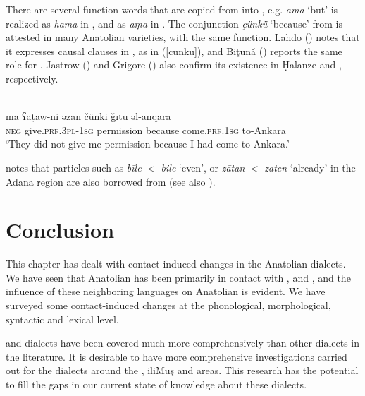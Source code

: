 \documentclass[output=paper]{langsci/langscibook}
\begin{document}
There are several function words that are copied from  into , e.g.  \textit{ama} `but' is realized as \textit{hama} in , and as \textit{a\d{m}a} in  . The conjunction \textit{\c{c}\"{u}nk\"{u}} `because' from  is attested in many Anatolian varieties, with the same function. Lahdo (\citeyear[179]{Lahdo2009}) notes that it expresses causal clauses in , as in (\ref{cunku}), and Biţună  (\citeyear[213]{Bituna2016}) reports the same role for . Jastrow (\citeyear[278]{Jastrow1981}) and Grigore (\citeyear[261]{Grigore2007book}) also confirm its existence in Ḥalanze and , respectively.

\begin{exe}
\ex {}  \citep[179]{Lahdo2009}\\
\label{cunku} \gll m\={a} ʕa\d{t}aw-ni əzan \v{c}\"{u}nki \v{g}\={i}tu əl-anqara\\
\textsc{neg} give.\textsc{prf.3pl}-\textsc{1sg} permission because come.\textsc{prf.1sg} to-Ankara\\
\glt `They did not give me permission because I had come to Ankara.'
\end{exe}


\noindent \cite{Procházka2005} notes that particles such as \textit{b\={i}le} $<$ \textit{bile} `even', or \textit{z\={a}tan} $<$ \textit{zaten} `already' in the Adana region are also borrowed from  (see also \citealt{Isaksson2005}).





\section{Conclusion}

This chapter has dealt with contact-induced changes in the Anatolian  dialects. We have seen that Anatolian  has been primarily in contact with ,  and , and the influence of these neighboring languages on Anatolian  is evident. We have surveyed some contact-induced changes at the phonological, morphological, syntactic and lexical level. %


 and  dialects have been covered much more comprehensively than other dialects in the literature. It is desirable to have more comprehensive investigations carried out for the dialects around the , ili{Muş} and  areas. This research has the potential to fill the gaps in our current state of knowledge about these dialects.
\end{document}
